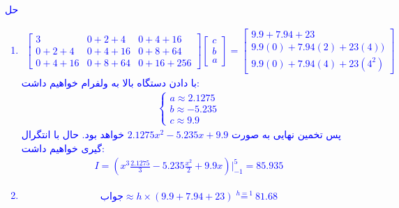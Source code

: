 \textcolor{blue}{حل
\\
\begin{enumerate}
    \item
    \begin{align*}
    \begin{bmatrix}
        3 & 0 + 2 + 4 & 0 + 4 + 16 \\
        0 + 2 + 4 & 0 + 4 + 16 & 0 + 8 + 64 \\
        0 + 4 + 16 & 0 + 8 + 64 & 0 + 16 + 256
    \end{bmatrix}
    \begin{bmatrix}
        c \\ b \\ a
    \end{bmatrix} = \begin{bmatrix}
        9.9 + 7.94 + 23 \\
        9.9 (0) + 7.94 (2) + 23 (4)) \\
        9.9 (0) + 7.94 (4) + 23 (4^2)
    \end{bmatrix}
    \end{align*}
    با دادن دستگاه بالا به ولفرام خواهیم داشت:
    \begin{align*}
        \begin{cases}
            a \approx 2.1275 \\
            b \approx -5.235 \\
            c \approx 9.9
        \end{cases}
    \end{align*}
    پس تخمین نهایی به صورت
    $2.1275 x^2 - 5.235x + 9.9$
    خواهد بود. حال با انتگرال گیری خواهیم داشت:
    \begin{align*}
        I = (x^3 \frac{2.1275}{3} - 5.235 \frac{x^2}{2} + 9.9 x) \Biggr|^{5}_{-1} = 85.935 
    \end{align*}
    \item 
    \begin{align*}
        \text{جواب} \approx h \times (9.9 + 7.94 + 23) \stackrel{h = 1}{=} 81.68
    \end{align*}
\end{enumerate}
}